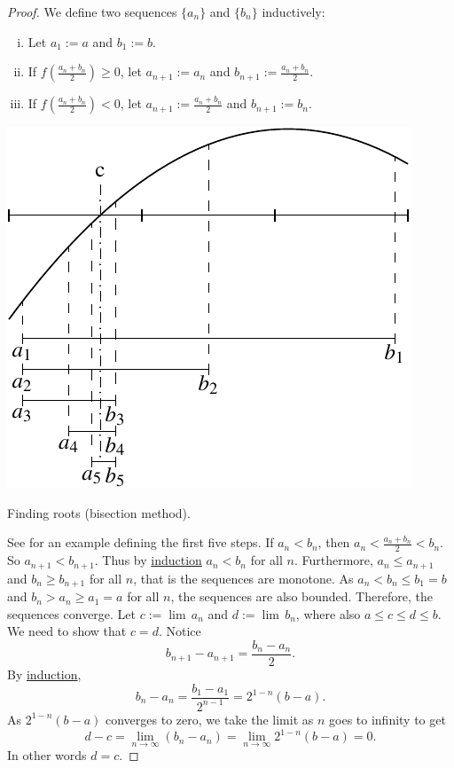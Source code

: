 \begin{proof}
We define two sequences $\{ a_n \}$
and $\{ b_n \}$ inductively:
\begin{enumerate}[(i)]
\item Let $a_1 := a$ and $b_1 := b$.
\item If $f\left(\frac{a_n+b_n}{2}\right) \geq 0$, let $a_{n+1} := a_n$ and
$b_{n+1} := \frac{a_n+b_n}{2}$.
\item If $f\left(\frac{a_n+b_n}{2}\right) < 0$, let $a_{n+1} := \frac{a_n+b_n}{2}$ and
$b_{n+1} := b_n$.
\end{enumerate}
\begin{myfigureht}
\includegraphics{figures/bisect}
\caption{Finding roots (bisection method).\label{bisectfig}}
\end{myfigureht}
See  for an example defining the first five steps.
If $a_n < b_n$, then $a_n < \frac{a_n+b_n}{2} < b_n$.  So
$a_{n+1} < b_{n+1}$.
Thus by \hyperref[induction:thm]{induction} $a_n < b_n$ for all $n$.
Furthermore, $a_n \leq a_{n+1}$ and 
$b_n \geq b_{n+1}$ for all $n$, that is the sequences are monotone.
As $a_n < b_n \leq b_1 = b$ and 
$b_n > a_n \geq a_1 = a$ for all $n$,
the sequences are also bounded.  Therefore, the
sequences converge.  Let $c := \lim\, a_n$ and $d := \lim\, b_n$,
where also $a \leq c \leq d \leq b$.  We need
to show that $c=d$.
Notice
\begin{equation*}
b_{n+1} - a_{n+1} = \frac{b_n-a_n}{2}.
\end{equation*}
By \hyperref[induction:thm]{induction},
\begin{equation*}
b_n - a_n = \frac{b_1-a_1}{2^{n-1}} = 2^{1-n} (b-a) .
\end{equation*}
As $2^{1-n}(b-a)$ converges to zero, we take the limit as $n$ goes to
infinity to get
\begin{equation*}
d-c = \lim_{n\to\infty} (b_n - a_n) =
\lim_{n\to\infty} 2^{1-n} (b-a) = 0.
\end{equation*}
In other words $d=c$.


\end{proof}
